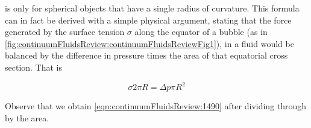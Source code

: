 is only for spherical objects that have a single radius of curvature.  This formula can in fact be derived with a simple physical argument, stating that the force generated by the surface tension $\sigma$ along the equator of a bubble (as in \ref{fig:continuumFluidsReview:continuumFluidsReviewFig1}), in a fluid would be balanced by the difference in pressure times the area of that equatorial cross section.  That is


\begin{equation}\label{eqn:continuumFluidsReview:1510}
\sigma 2 \pi R = \Delta p \pi R^2
\end{equation}

Observe that we obtain \ref{eqn:continuumFluidsReview:1490} after dividing through by the area.


